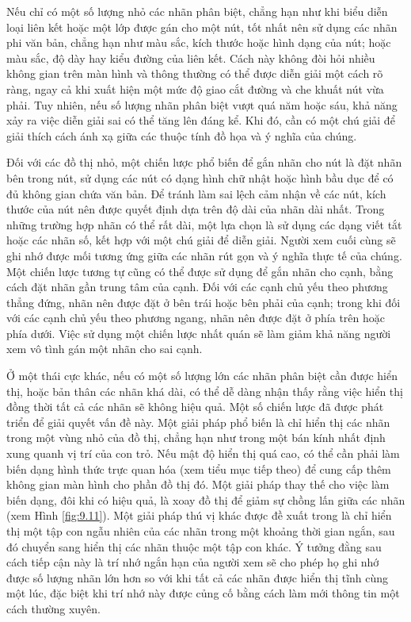 \documentclass[12pt,a4paper, openany]{book}
\begin{document}
Nếu chỉ có một số lượng nhỏ các nhãn phân biệt, chẳng hạn như khi biểu diễn loại liên kết hoặc một lớp được gán cho một nút, tốt nhất nên sử dụng các nhãn phi văn bản, chẳng hạn như màu sắc, kích thước hoặc hình dạng của nút; hoặc màu sắc, độ dày hay kiểu đường của liên kết. Cách này không đòi hỏi nhiều không gian trên màn hình và thông thường có thể được diễn giải một cách rõ ràng, ngay cả khi xuất hiện một mức độ giao cắt đường và che khuất nút vừa phải. Tuy nhiên, nếu số lượng nhãn phân biệt vượt quá năm hoặc sáu, khả năng xảy ra việc diễn giải sai có thể tăng lên đáng kể. Khi đó, cần có một chú giải để giải thích cách ánh xạ giữa các thuộc tính đồ họa và ý nghĩa của chúng.

Đối với các đồ thị nhỏ, một chiến lược phổ biến để gắn nhãn cho nút là đặt nhãn bên trong nút, sử dụng các nút có dạng hình chữ nhật hoặc hình bầu dục để có đủ không gian chứa văn bản. Để tránh làm sai lệch cảm nhận về các nút, kích thước của nút nên được quyết định dựa trên độ dài của nhãn dài nhất. Trong những trường hợp nhãn có thể rất dài, một lựa chọn là sử dụng các dạng viết tắt hoặc các nhãn số, kết hợp với một chú giải để diễn giải. Người xem cuối cùng sẽ ghi nhớ được mối tương ứng giữa các nhãn rút gọn và ý nghĩa thực tế của chúng. Một chiến lược tương tự cũng có thể được sử dụng để gắn nhãn cho cạnh, bằng cách đặt nhãn gần trung tâm của cạnh. Đối với các cạnh chủ yếu theo phương thẳng đứng, nhãn nên được đặt ở bên trái hoặc bên phải của cạnh; trong khi đối với các cạnh chủ yếu theo phương ngang, nhãn nên được đặt ở phía trên hoặc phía dưới. Việc sử dụng một chiến lược nhất quán sẽ làm giảm khả năng người xem vô tình gán một nhãn cho sai cạnh.

Ở một thái cực khác, nếu có một số lượng lớn các nhãn phân biệt cần được hiển thị, hoặc bản thân các nhãn khá dài, có thể dễ dàng nhận thấy rằng việc hiển thị đồng thời tất cả các nhãn sẽ không hiệu quả. Một số chiến lược đã được phát triển để giải quyết vấn đề này. Một giải pháp phổ biến là chỉ hiển thị các nhãn trong một vùng nhỏ của đồ thị, chẳng hạn như trong một bán kính nhất định xung quanh vị trí của con trỏ. Nếu mật độ hiển thị quá cao, có thể cần phải làm biến dạng hình thức trực quan hóa (xem tiểu mục tiếp theo) để cung cấp thêm không gian màn hình cho phần đồ thị đó. Một giải pháp thay thế cho việc làm biến dạng, đôi khi có hiệu quả, là xoay đồ thị để giảm sự chồng lấn giữa các nhãn (xem Hình \ref{fig:9.11}). Một giải pháp thú vị khác được đề xuất trong \cite{brodbeck1997} là chỉ hiển thị một tập con ngẫu nhiên của các nhãn trong một khoảng thời gian ngắn, sau đó chuyển sang hiển thị các nhãn thuộc một tập con khác. Ý tưởng đằng sau cách tiếp cận này là trí nhớ ngắn hạn của người xem sẽ cho phép họ ghi nhớ được số lượng nhãn lớn hơn so với khi tất cả các nhãn được hiển thị tĩnh cùng một lúc, đặc biệt khi trí nhớ này được củng cố bằng cách làm mới thông tin một cách thường xuyên.
\end{document}
